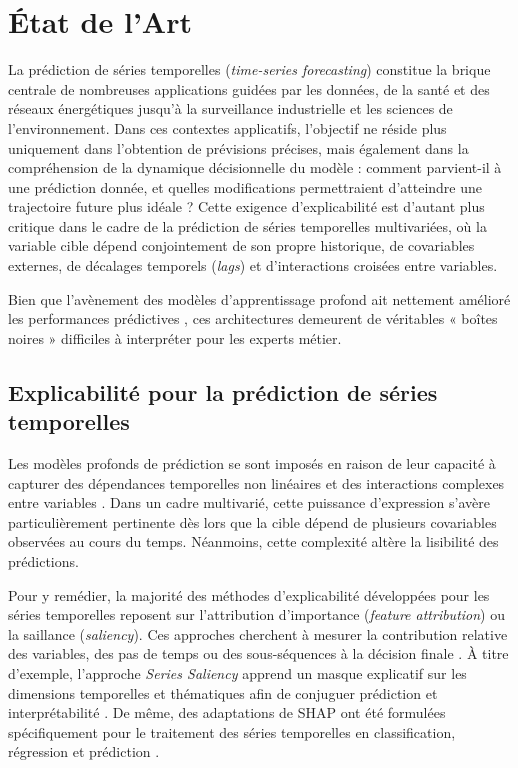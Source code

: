 \newpage
\section{État de l'Art}
\label{sec:etat_art}

La prédiction de séries temporelles (\textit{time-series forecasting}) constitue la brique centrale de nombreuses applications guidées par les données, de la santé et des réseaux énergétiques jusqu'à la surveillance industrielle et les sciences de l'environnement. Dans ces contextes applicatifs, l'objectif ne réside plus uniquement dans l'obtention de prévisions précises, mais également dans la compréhension de la dynamique décisionnelle du modèle : comment parvient-il à une prédiction donnée, et quelles modifications permettraient d'atteindre une trajectoire future plus idéale ? Cette exigence d'explicabilité est d'autant plus critique dans le cadre de la prédiction de séries temporelles multivariées, où la variable cible dépend conjointement de son propre historique, de covariables externes, de décalages temporels (\textit{lags}) et d'interactions croisées entre variables.

Bien que l'avènement des modèles d'apprentissage profond ait nettement amélioré les performances prédictives \cite{petropoulos2022forecasting, kong2025deep, wang2024deep, lv2024efficient}, ces architectures demeurent de véritables « boîtes noires » difficiles à interpréter pour les experts métier.

\subsection{Explicabilité pour la prédiction de séries temporelles}

Les modèles profonds de prédiction se sont imposés en raison de leur capacité à capturer des dépendances temporelles non linéaires et des interactions complexes entre variables \cite{petropoulos2022forecasting, kong2025deep, wang2024deep}. Dans un cadre multivarié, cette puissance d'expression s'avère particulièrement pertinente dès lors que la cible dépend de plusieurs covariables observées au cours du temps. Néanmoins, cette complexité altère la lisibilité des prédictions.

Pour y remédier, la majorité des méthodes d'explicabilité développées pour les séries temporelles reposent sur l'attribution d'importance (\textit{feature attribution}) ou la saillance (\textit{saliency}). Ces approches cherchent à mesurer la contribution relative des variables, des pas de temps ou des sous-séquences à la décision finale \cite{saadallah2021explainable, pan2021series, nguyen2025tshap, choi2025vector}. À titre d'exemple, l'approche \textit{Series Saliency} apprend un masque explicatif sur les dimensions temporelles et thématiques afin de conjuguer prédiction et interprétabilité \cite{pan2021series}. De même, des adaptations de SHAP ont été formulées spécifiquement pour le traitement des séries temporelles en classification, régression et prédiction \cite{nguyen2025tshap, choi2025vector}.

